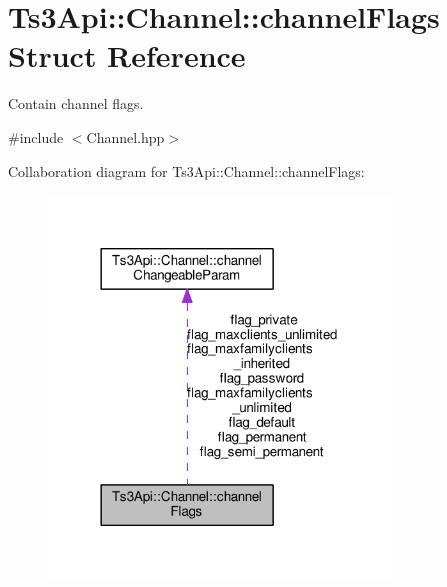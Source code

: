 \hypertarget{struct_ts3_api_1_1_channel_1_1channel_flags}{}\section{Ts3\+Api\+:\+:Channel\+:\+:channel\+Flags Struct Reference}
\label{struct_ts3_api_1_1_channel_1_1channel_flags}


Contain channel flags.  




{\ttfamily \#include $<$Channel.\+hpp$>$}



Collaboration diagram for Ts3\+Api\+:\+:Channel\+:\+:channel\+Flags\+:\nopagebreak
\begin{figure}[H]
\begin{center}
\leavevmode
\includegraphics[width=258pt]{struct_ts3_api_1_1_channel_1_1channel_flags__coll__graph}
\end{center}
\end{figure}
